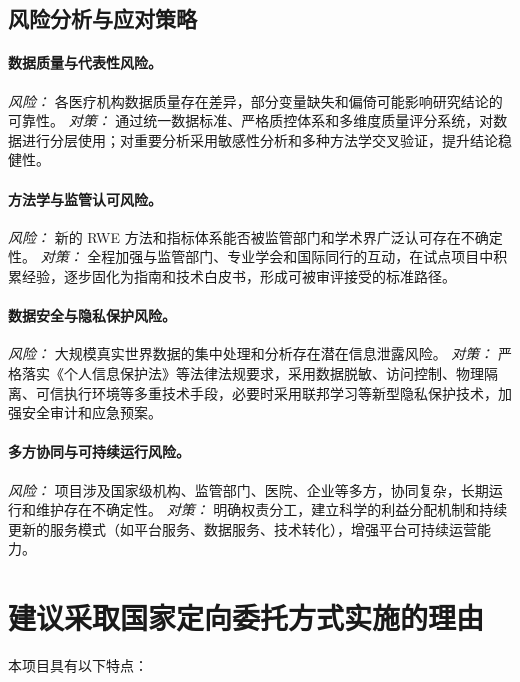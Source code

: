 \documentclass[12pt, a4paper, fontset=mac]{ctexart} %
\begin{document}
\subsection{风险分析与应对策略}

\paragraph{数据质量与代表性风险。}  
\emph{风险：} 各医疗机构数据质量存在差异，部分变量缺失和偏倚可能影响研究结论的可靠性。  
\emph{对策：} 通过统一数据标准、严格质控体系和多维度质量评分系统，对数据进行分层使用；对重要分析采用敏感性分析和多种方法学交叉验证，提升结论稳健性。

\paragraph{方法学与监管认可风险。}  
\emph{风险：} 新的 RWE 方法和指标体系能否被监管部门和学术界广泛认可存在不确定性。  
\emph{对策：} 全程加强与监管部门、专业学会和国际同行的互动，在试点项目中积累经验，逐步固化为指南和技术白皮书，形成可被审评接受的标准路径。

\paragraph{数据安全与隐私保护风险。}  
\emph{风险：} 大规模真实世界数据的集中处理和分析存在潜在信息泄露风险。  
\emph{对策：} 严格落实《个人信息保护法》等法律法规要求，采用数据脱敏、访问控制、物理隔离、可信执行环境等多重技术手段，必要时采用联邦学习等新型隐私保护技术，加强安全审计和应急预案。

\paragraph{多方协同与可持续运行风险。}  
\emph{风险：} 项目涉及国家级机构、监管部门、医院、企业等多方，协同复杂，长期运行和维护存在不确定性。  
\emph{对策：} 明确权责分工，建立科学的利益分配机制和持续更新的服务模式（如平台服务、数据服务、技术转化），增强平台可持续运营能力。

\section{建议采取国家定向委托方式实施的理由}

本项目具有以下特点：
\end{document}
